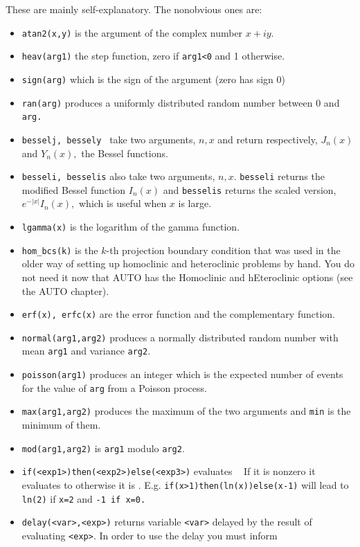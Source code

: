 \documentclass{article}
\begin{document}
These are mainly self-explanatory. The nonobvious ones are:
\begin{itemize}
\item {\tt atan2(x,y)} is the argument of the complex number $x+iy.$
\item {\tt heav(arg1)} the step function, zero if {\tt arg1<0} and 1 otherwise.
\item {\tt sign(arg)} which is the sign of the argument (zero has sign 0)
\item {\tt ran(arg)} produces a uniformly distributed random number
between 0 and {\tt arg.}
\item {\tt besselj, bessely } take two arguments, $n,x$ and return
respectively, $J_n(x)$ and $Y_n(x),$ the Bessel functions.
\item {\tt besseli, besselis} also take two arguments, $n,x$.  {\tt besseli} returns the modified Bessel function $I_n(x)$ and
{\tt besselis} returns the scaled version, $e^{-|x|}I_n(x),$ which is useful when $x$ is large.
\item {\tt lgamma(x)} is the logarithm of the gamma function.
\item {\tt hom\_bcs(k)} is the $k$-th projection boundary condition that was used in the older way of setting up homoclinic
and heteroclinic problems by hand.  You do not need it now that AUTO has the Homoclinic and hEteroclinic options (see the AUTO chapter).
\item { \tt erf(x), erfc(x)} are the error function and the
complementary function. 
\item {\tt normal(arg1,arg2)} produces a normally distributed random number
with mean {\tt arg1}  and variance {\tt arg2}.
\item {\tt poisson(arg1)} produces an integer which is the expected number
of events for the value of {\tt arg} from a Poisson process.
\item {\tt max(arg1,arg2)} produces the maximum of the two arguments
and {\tt min}  is 
the minimum of them.
\item {\tt mod(arg1,arg2)} is  {\tt arg1} modulo {\tt arg2}. 
\item {\tt if(<exp1>)then(<exp2>)else(<exp3>)} evaluates {\tt <exp1> }
If it is nonzero 
it evaluates to {\tt <exp2>} otherwise it is { \tt <exp3>}.  E.g. {\tt if(x>1)then(ln(x))else(x-1)}
will lead to {\tt ln(2)}  if {\tt x=2}  and { \tt -1 if x=0.}
\item {\tt delay(<var>,<exp>)} returns variable {\tt <var>} delayed by the result of
 evaluating {\tt <exp>}.  In order to use the delay you must inform

\end{itemize}
\end{document}
